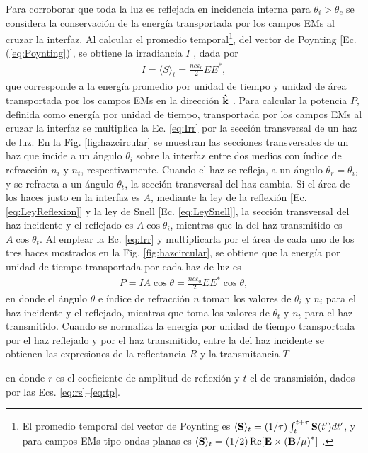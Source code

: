 Para corroborar que toda la luz es reflejada en incidencia interna para $\theta_i>\theta_c$ se considera la conservación de la energía transportada por los campos EMs al cruzar la interfaz. Al calcular el promedio temporal\footnote{El promedio temporal del vector de Poynting es $\langle\vb{S}\rangle_t = (1/\tau)\int_t^{t+\tau}\vb{S}(t')dt'$, y para campos EMs tipo ondas planas es $\langle\vb{S}\rangle_t = (1/2) \Re[\vb{E}\times\qty(\vb{B}/\mu)^*]$ \cite{jackson1999electrodynamics}.}, del vector de Poynting [Ec. (\ref{eq:Poynting})], se obtiene la irradiancia $I$ \cite{hecht1998optics}, dada por
	\begin{align}
	I = \langle S \rangle_t = \frac{nc\varepsilon_0}{2} EE^*,
	\label{eq:Irr}
	\end{align}
que corresponde a la energía promedio por unidad de tiempo y unidad de área  transportada por los campos EMs en la dirección $\vu{k}$ \cite{griffiths2013electrodynamics}. Para calcular la potencia $P$, definida como energía por unidad de tiempo, transportada por los campos EMs al cruzar la interfaz se multiplica la Ec. \eqref{eq:Irr} por la sección transversal de un haz de luz. En la Fig. \ref{fig:hazcircular} se muestran las secciones transversales de un haz  que incide a un ángulo $\theta_i$ sobre la interfaz entre dos medios con índice de refracción $n_i$ y $n_t$, respectivamente. Cuando el haz se refleja, a un ángulo $\theta_r=\theta_i$, y se refracta a un ángulo $\theta_t$, la sección transversal del haz cambia. Si el área de los haces justo en la interfaz es $A$, mediante la ley de la reflexión [Ec. \eqref{eq:LeyReflexion}] y la ley de Snell [Ec. \eqref{eq:LeySnell}], la sección transversal del haz incidente y el reflejado  es $A\cos\theta_i$, mientras que la del haz transmitido es $A\cos\theta_t$. Al emplear la Ec. \eqref{eq:Irr} y multiplicarla por el área de cada uno de los tres haces mostrados en la Fig. \ref{fig:hazcircular}, se obtiene que la energía por unidad de tiempo transportada por cada haz de luz es
	\begin{align*}
	P = I A \cos\theta = \frac{n c \varepsilon_0}{2}  EE^* \cos\theta,
	\end{align*}
en donde el ángulo $\theta$ e índice de refracción $n$ toman los valores de $\theta_i$ y $n_i$ para el haz incidente y el reflejado, mientras que  toma los valores de $\theta_t$ y  $n_t$ para el haz transmitido. Cuando se normaliza la energía por unidad de tiempo transportada por el haz reflejado y por el haz transmitido, entre la del haz incidente se obtienen las expresiones de la reflectancia $R$ y la transmitancia $T$ \cite{hecht1998optics} \vspace{-.5em} 
	\begin{tcolorbox}[title = Reflectancia y transmitancia]
	\end{tcolorbox}\vspace*{-.75em}\noindent	
en donde $r$ es el coeficiente de amplitud de reflexión y $t$ el de transmisión, dados por las Ecs. \eqref{eq:rs}--\eqref{eq:tp}.

